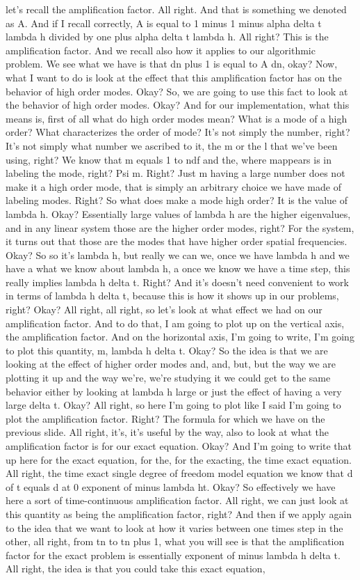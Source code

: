 \documentclass[10pt]{article}
\begin{document}
let's recall the amplification factor. All right. And that is something we denoted as A. And if I recall correctly, A is equal to 1 minus 1 minus alpha delta t lambda h divided by one plus alpha delta t lambda h. All right? This is the amplification factor. And we recall also how it applies to our algorithmic problem. We see what we have is that dn plus 1 is equal to A dn, okay? Now, what I want to do is look at the effect that this amplification factor has on the behavior of high order modes. Okay? So, we are going to use this fact to look at the behavior of high order modes. Okay? And for our implementation, what this means is, first of all what do high order modes mean? What is a mode of a high order? What characterizes the order of mode? It's not simply the number, right? It's not simply what number we ascribed to it, the m or the l that we've been using, right? We know that m equals 1 to ndf and the, where mappears is in labeling the mode, right? Psi m. Right? Just m having a large number does not make it a high order mode, that is simply an arbitrary choice we have made of labeling modes. Right? So what does make a mode high order? It is the value of lambda h. Okay? Essentially large values of lambda h are the higher eigenvalues, and in any linear system those are the higher order modes, right? For the system, it turns out that those are the modes that have higher order spatial frequencies. Okay? So so it's lambda h, but really we can we, once we have lambda h and we have a what we know about lambda h, a once we know we have a time step, this really implies lambda h delta t. Right? And it's doesn't need convenient to work in terms of lambda h delta t, because this is how it shows up in our problems, right? Okay? All right, all right, so let's look at what effect we had on our amplification factor. And to do that, I am going to plot up on the vertical axis, the amplification factor. And on the horizontal axis, I'm going to write, I'm going to plot this quantity, m, lambda h delta t. Okay? So the idea is that we are looking at the effect of higher order modes and, and, but, but the way we are plotting it up and the way we're, we're studying it we could get to the same behavior either by looking at lambda h large or just the effect of having a very large delta t. Okay? All right, so here I'm going to plot like I said I'm going to plot the amplification factor. Right? The formula for which we have on the previous slide. All right, it's, it's useful by the way, also to look at what the amplification factor is for our exact equation. Okay? And I'm going to write that up here for the exact equation, for the, for the exacting, the time exact equation. All right, the time exact single degree of freedom model equation we know that d of t equals d at 0 exponent of minus lambda ht. Okay? So effectively we have here a sort of time-continuous amplification factor. All right, we can just look at this quantity as being the amplification factor, right? And then if we apply again to the idea that we want to look at how it varies between one times step in the other, all right, from tn to tn plus 1, what you will see is that the amplification factor for the exact problem is essentially exponent of minus lambda h delta t. All right, the idea is that you could take this exact equation, 
\end{document}
